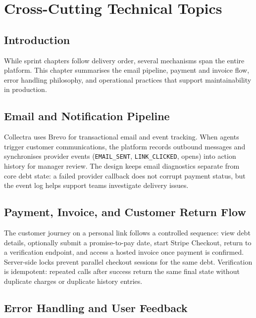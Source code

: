 \documentclass[12pt,a4paper]{report}
\begin{document}
\clearpage
\chapter{Cross-Cutting Technical Topics}
\label{chap:crosscutting}

\section*{Introduction}
{}

While sprint chapters follow delivery order, several mechanisms span the entire platform.
This chapter summarises the email pipeline, payment and invoice flow, error handling philosophy,
and operational practices that support maintainability in production.

\section{Email and Notification Pipeline}

Collectra uses Brevo for transactional email and event tracking.
When agents trigger customer communications, the platform records outbound messages and
synchronises provider events (\texttt{EMAIL\_SENT}, \texttt{LINK\_CLICKED}, opens) into
action history for manager review.
The design keeps email diagnostics separate from core debt state: a failed provider callback
does not corrupt payment status, but the event log helps support teams investigate delivery issues.

\section{Payment, Invoice, and Customer Return Flow}

The customer journey on a personal link follows a controlled sequence:
view debt details, optionally submit a promise-to-pay date, start Stripe Checkout, return to
a verification endpoint, and access a hosted invoice once payment is confirmed.
Server-side locks prevent parallel checkout sessions for the same debt.
Verification is idempotent: repeated calls after success return the same final state without
duplicate charges or duplicate history entries.

\section{Error Handling and User Feedback}
\end{document}
